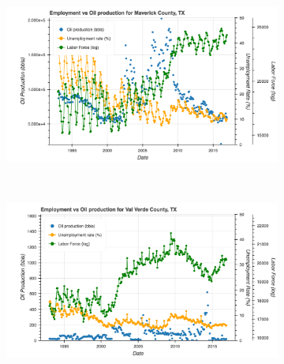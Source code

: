 \documentclass[11pt,letterpaper]{article}
\begin{document}
\begin{figure}
\begin{subfigure}{0.45\textwidth}
\includegraphics[width=1.1\linewidth]{tx_maverick_oil_prod}
\end{subfigure}
~
\begin{subfigure}{0.45\textwidth}
\includegraphics[width=1.1\linewidth]{tx_valverde_oil_prod}
\end{subfigure}


\end{figure}
\end{document}
